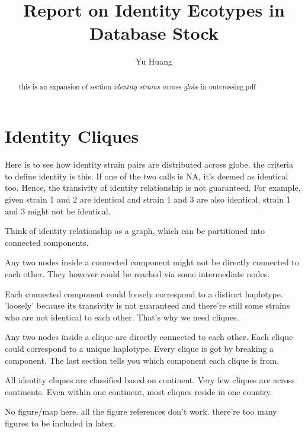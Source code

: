 \documentclass[a4paper,10pt]{article}
\title{Report on Identity Ecotypes in Database Stock}
\author{Yu Huang}
\begin{document}
\maketitle

\begin{abstract}
this is an expansion of section \emph{identity strains across globe} in outcrossing.pdf
\end{abstract}

\tableofcontents


\section{Identity Cliques}
Here is to see how identity strain pairs are distributed across globe.  the criteria to define identity is this. If one of the two calls is NA, it's deemed as identical too. Hence, the transivity of identity relationship is not guaranteed. For example, given strain 1 and 2 are identical and strain 1 and 3 are also identical, strain 1 and 3 might not be identical.

Think of identity relationship as a graph, which can be partitioned into connected components.

Any two nodes inside a connected component might not be directly connected to each other. They however could be reached via some intermediate nodes.

Each connected component could loosely correspond to a distinct haplotype. 'loosely' because its transivity is not guaranteed and there're still some strains who are not identical to each other. That's why we need cliques.

Any two nodes inside a clique are directly connected to each other. Each clique could correspond to a unique haplotype. Every clique is got by breaking a component. The last section tells you which component each clique is from.

All identity cliques are classified based on continent. Very few cliques are across continents. Even within one continent, most cliques reside in one country.

No figure/map here. all the figure references don't work. there're too many figures to be included in latex.



\end{document}
